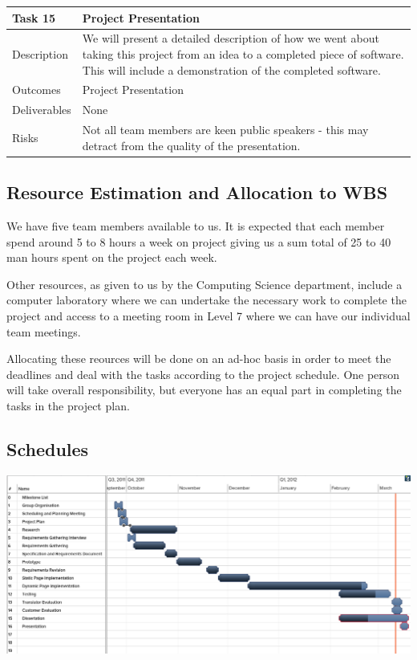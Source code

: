 \documentclass{l3proj}
\begin{document}
\begin{center}
    \begin{tabular}{ | l | p{12cm} |}
    \hline	
    Task 15 & Project Presentation \\ \hline
    Description & We will present a detailed description of how we went about taking this project from an idea to a completed piece of software. This will include a demonstration of the completed software. \\ \hline   
    Outcomes & Project Presentation \\ \hline
    Deliverables & None \\ \hline
    Risks & Not all team members are keen public speakers - this may detract from the quality of the presentation. \\ 
    \hline
    \end{tabular}
\end{center}

\subsection{Resource Estimation and Allocation to WBS}
We have five team members available to us. It is expected that each member spend around 5 to 8 hours a week on project giving us a sum total of 25 to 40 man hours spent on the project each week.

Other resources, as given to us by the Computing Science department, include a computer laboratory where we can undertake the necessary work to complete the project and access to a meeting room in Level 7 where we can have our individual team meetings.

Allocating these reources will be done on an ad-hoc basis in order to meet the deadlines and deal with the tasks according to the project schedule.
One person will take overall responsibility, but everyone has an equal part in completing the tasks in the project plan.
\subsection{Schedules}
\includegraphics[scale=0.5, angle=90]{gantt}
\end{document}
